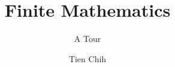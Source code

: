\documentclass[a4paper,twoside]{scrbook}
\theoremstyle{definition}
\theoremstyle{definition}
\numberwithin{equation}{section}
\begin{document}
\title{Finite Mathematics}
\subtitle{A Tour}
\author{Tien Chih}
\date{}
\frontmatter
\maketitle
\tableofcontents
\mainmatter
%

\end{document}
